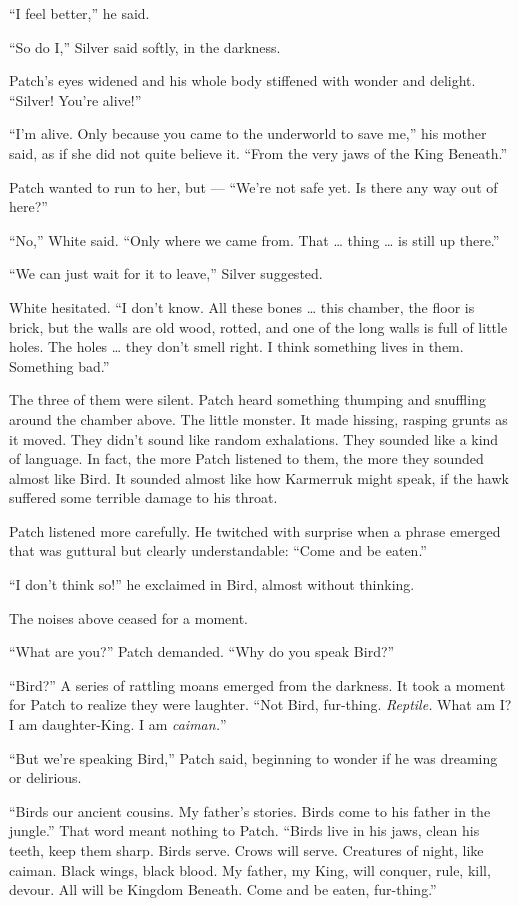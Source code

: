 \documentclass[ebook,oneside,openany,17pt]{memoir}
\newenvironment{tolerant}[1]{%
  \par\tolerance=#1\relax
}{%
  \par
}
\begin{document}
“I feel better,” he said.

“So do I,” Silver said softly, in the darkness.

Patch’s eyes widened and his whole body stiffened with wonder and
delight. “Silver! You’re alive!”

“I’m alive. Only because you came to the underworld to save me,” his
mother said, as if she did not quite believe it. “From the very jaws
of the King Beneath.”

Patch wanted to run to her, but — “We’re not safe yet. Is there any
way out of here?”

“No,” White said. “Only where we came from. That … thing … is still up
there.”

“We can just wait for it to leave,” Silver suggested.

White hesitated. “I don’t know. All these bones … this chamber, the
floor is brick, but the walls are old wood, rotted, and one of the
long walls is full of little holes. The holes … they don’t smell
right. I think something lives in them. Something bad.”

The three of them were silent. Patch heard something thumping and
snuffling around the chamber above. The little monster. It made
hissing, rasping grunts as it moved. They didn’t sound like random
exhalations. They sounded like a kind of language. In fact, the more
Patch listened to them, the more they sounded almost like Bird. It
sounded almost like how Karmerruk might speak, if the hawk suffered
some terrible damage to his throat.

\begin{tolerant}{1000}
Patch listened more carefully. He twitched with surprise when a phrase
emerged that was guttural but clearly understandable: “Come and be
eaten.”
\end{tolerant}

“I don’t think so!” he exclaimed in Bird, almost without thinking.

The noises above ceased for a moment.

“What are you?” Patch demanded. “Why do you speak Bird?”

“Bird?” A series of rattling moans emerged from the darkness. It took
a moment for Patch to realize they were laughter. “Not Bird,
fur-thing. \emph{Reptile.} What am I? I am daughter-King. I am
\emph{caiman.}”

“But we’re speaking Bird,” Patch said, beginning to wonder if he was
dreaming or delirious.

“Birds our ancient cousins. My father’s stories. Birds come to his
father in the jungle.” That word meant nothing to Patch. “Birds live
in his jaws, clean his teeth, keep them sharp. Birds serve. Crows will
serve. Creatures of night, like caiman. Black wings, black blood. My
father, my King, will conquer, rule, kill, devour. All will be Kingdom
Beneath. Come and be eaten, fur-thing.”
\end{document}
